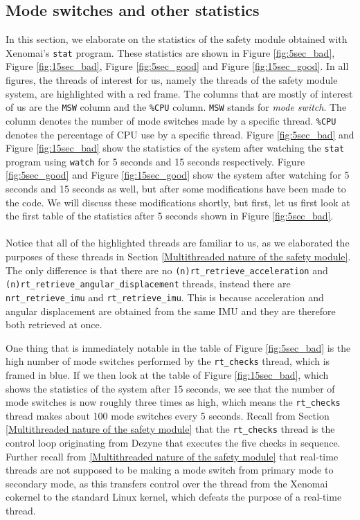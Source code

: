 \documentclass[12pt]{scrreprt}
\begin{document}
\subsection{Mode switches and other statistics}
\label{Mode switches and other statistics}
In this section, we elaborate on the statistics of the safety module obtained with Xenomai's \texttt{stat} program. These statistics are shown in Figure \ref{fig:5sec_bad}, Figure \ref{fig:15sec_bad}, Figure \ref{fig:5sec_good} and Figure \ref{fig:15sec_good}. In all figures, the threads of interest for us, namely the threads of the safety module system, are highlighted with a red frame. The columns that are mostly of interest of us are the \texttt{MSW} column and the \texttt{\%CPU} column. \texttt{MSW} stands for \textit{mode switch}. The column denotes the number of mode switches made by a specific thread. \texttt{\%CPU} denotes the percentage of CPU use by a specific thread. Figure \ref{fig:5sec_bad} and Figure \ref{fig:15sec_bad} show the statistics of the system after watching the \texttt{stat} program using \texttt{watch} for 5 seconds and 15 seconds respectively. Figure \ref{fig:5sec_good} and Figure \ref{fig:15sec_good} show the system after watching for 5 seconds and 15 seconds as well, but after some modifications have been made to the code. We will discuss these modifications shortly, but first, let us first look at the first table of the statistics after 5 seconds shown in Figure \ref{fig:5sec_bad}.
\\\\
Notice that all of the highlighted threads are familiar to us, as we elaborated the purposes of these threads in Section \ref{Multithreaded nature of the safety module}. The only difference is that there are no \texttt{(n)rt\_retrieve\_acceleration} and \texttt{(n)rt\_retrieve\_angular\_displacement} threads, instead there are \texttt{nrt\_retrieve\_imu} and \texttt{rt\_retrieve\_imu}. This is because acceleration and angular displacement are obtained from the same IMU and they are therefore both retrieved at once.
\par
One thing that is immediately notable in the table of Figure \ref{fig:5sec_bad} is the high number of mode switches performed by the \texttt{rt\_checks} thread, which is framed in blue. If we then look at the table of Figure \ref{fig:15sec_bad}, which shows the statistics of the system after 15 seconds, we see that the number of mode switches is now roughly three times as high, which means the \texttt{rt\_checks} thread makes about 100 mode switches every 5 seconds. Recall from Section \ref{Multithreaded nature of the safety module} that the \texttt{rt\_checks} thread is the control loop originating from Dezyne that executes the five checks in sequence. Further recall from \ref{Multithreaded nature of the safety module} that real-time threads are not supposed to be making a mode switch from primary mode to secondary mode, as this transfers control over the thread from the Xenomai cokernel to the standard Linux kernel, which defeats the purpose of a real-time thread.
\end{document}

